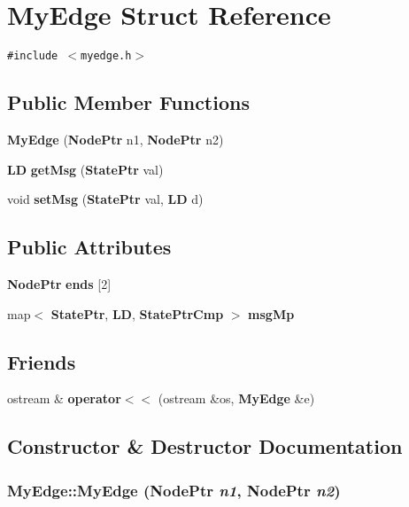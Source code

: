 \section{MyEdge Struct Reference}
\label{structMyEdge}
{\tt \#include $<$myedge.h$>$}

\subsection*{Public Member Functions}
\begin{CompactItemize}
\item 
{\bf MyEdge} ({\bf NodePtr} n1, {\bf NodePtr} n2)
\item 
{\bf LD} {\bf getMsg} ({\bf StatePtr} val)
\item 
void {\bf setMsg} ({\bf StatePtr} val, {\bf LD} d)
\end{CompactItemize}
\subsection*{Public Attributes}
\begin{CompactItemize}
\item 
{\bf NodePtr} {\bf ends} [2]
\item 
map$<$ {\bf StatePtr}, {\bf LD}, {\bf StatePtrCmp} $>$ {\bf msgMp}
\end{CompactItemize}
\subsection*{Friends}
\begin{CompactItemize}
\item 
ostream \& {\bf operator$<$$<$} (ostream \&os, {\bf MyEdge} \&e)
\end{CompactItemize}


\subsection{Constructor \& Destructor Documentation}
\subsubsection{\setlength{\rightskip}{0pt plus 5cm}MyEdge::MyEdge ({\bf NodePtr} {\em n1}, {\bf NodePtr} {\em n2})\hspace{0.3cm}{\tt  [inline]}}\label{structMyEdge_b7915fe8b92575e5828d658f3b362310}




